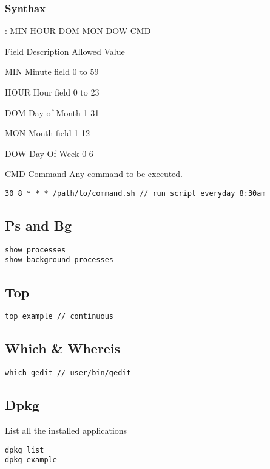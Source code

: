 \subsubsection{Synthax}

: MIN HOUR DOM MON DOW CMD

Field    Description    Allowed Value

MIN      Minute field    0 to 59

HOUR     Hour field      0 to 23

DOM      Day of Month    1-31

MON      Month field     1-12

DOW      Day Of Week     0-6

CMD      Command         Any command to be executed.

\begin{verbatim}
30 8 * * * /path/to/command.sh // run script everyday 8:30am
\end{verbatim}

\subsection{Ps and Bg}

\begin{verbatim}
show processes
show background processes
\end{verbatim}

\subsection{Top}
\begin{verbatim}
top example // continuous
\end{verbatim}

\subsection{Which & Whereis}

\begin{verbatim}
which gedit // user/bin/gedit 
\end{verbatim}

\subsection{Dpkg}

List all the installed applications

\begin{verbatim}
dpkg list
dpkg example 
\end{verbatim}

